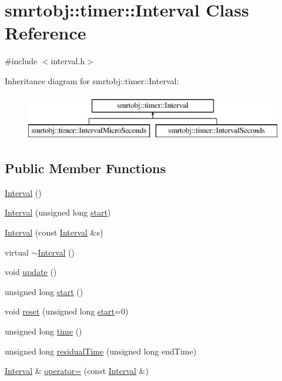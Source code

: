 \hypertarget{classsmrtobj_1_1timer_1_1_interval}{}\section{smrtobj\+:\+:timer\+:\+:Interval Class Reference}
\label{classsmrtobj_1_1timer_1_1_interval}


{\ttfamily \#include $<$interval.\+h$>$}

Inheritance diagram for smrtobj\+:\+:timer\+:\+:Interval\+:\begin{figure}[H]
\begin{center}
\leavevmode
\includegraphics[height=2.000000cm]{classsmrtobj_1_1timer_1_1_interval}
\end{center}
\end{figure}
\subsection*{Public Member Functions}
\begin{DoxyCompactItemize}
\item 
\hyperlink{classsmrtobj_1_1timer_1_1_interval_aaf7a279101cc8d105693107d9bdcb26a}{Interval} ()
\item 
\hyperlink{classsmrtobj_1_1timer_1_1_interval_a1b2142dfa79eb5535a88609045a24d6e}{Interval} (unsigned long \hyperlink{classsmrtobj_1_1timer_1_1_interval_a323a909c95c592217e9be9cd5a313cb9}{start})
\item 
\hyperlink{classsmrtobj_1_1timer_1_1_interval_a7f90e3bf2de5acf32809e0c2379f2228}{Interval} (const \hyperlink{classsmrtobj_1_1timer_1_1_interval}{Interval} \&s)
\item 
virtual \hyperlink{classsmrtobj_1_1timer_1_1_interval_a3425f23d684c0c7501400f4dcc199078}{$\sim$\+Interval} ()
\item 
void \hyperlink{classsmrtobj_1_1timer_1_1_interval_a410562823bb9c16de498db2fbe2b14ec}{update} ()
\item 
unsigned long \hyperlink{classsmrtobj_1_1timer_1_1_interval_a323a909c95c592217e9be9cd5a313cb9}{start} ()
\item 
void \hyperlink{classsmrtobj_1_1timer_1_1_interval_aff1a426750f4c2f5534387ed2e8a8bdc}{reset} (unsigned long \hyperlink{classsmrtobj_1_1timer_1_1_interval_a323a909c95c592217e9be9cd5a313cb9}{start}=0)
\item 
unsigned long \hyperlink{classsmrtobj_1_1timer_1_1_interval_ae94300e5c29ba819eaaeb343b7caaeb5}{time} ()
\item 
unsigned long \hyperlink{classsmrtobj_1_1timer_1_1_interval_a1a3cef1ea187fad7f4abd1ee51dba09a}{residual\+Time} (unsigned long end\+Time)
\item 
\hyperlink{classsmrtobj_1_1timer_1_1_interval}{Interval} \& \hyperlink{classsmrtobj_1_1timer_1_1_interval_a3436785777d0868204112c72d5d2cace}{operator=} (const \hyperlink{classsmrtobj_1_1timer_1_1_interval}{Interval} \&)
\end{DoxyCompactItemize}
